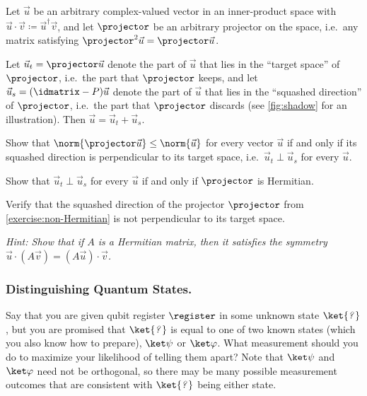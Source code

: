       \begin{exercise}\label{exercise:Hermitian}
        Let $\vec{u}$ be an arbitrary complex-valued vector 
        in an inner-product space 
        with %
        $\vec u \cdot \vec v \coloneqq \vec{u}^\dagger \vec{v}$,
        and let $\projector$ be an arbitrary projector on the space, i.e.\ any matrix
        satisfying $\projector^2 \vec{u} = \projector \vec{u}$.

        Let $\vec{u}_t = \projector \vec u$ denote the part of $\vec u$ that
        lies in the ``target space'' of $\projector$,
        i.e.\ the part that $\projector$ keeps, and let 
        $\vec{u}_s = (\idmatrix - P) \vec u$ 
        denote the part of $\vec u$ that lies in the ``squashed direction'' of
        $\projector$, i.e.\ the part that $\projector$ discards (see 
        \cref{fig:shadow} for an illustration). Then $\vec u = \vec{u}_t + \vec{u}_s$.
        \begin{subex}
          \item Show that $\norm{\projector \vec u} \leq \norm{\vec u}$ for
            every vector $\vec u$ if and only if its squashed direction is
            perpendicular to its target space, i.e.\ 
            $\vec{u}_t \perp \vec{u}_s$ for every $\vec u$.
          \item Show that 
            $\vec{u}_t \perp \vec{u}_s$ for every $\vec u$
            if and only if $\projector$ is Hermitian. 
          \item Verify that the squashed direction of the projector $\projector$
            from \cref{exercise:non-Hermitian} is not perpendicular to its
            target space.
        \end{subex}
        \emph{
          Hint: Show that if $A$ is a Hermitian matrix, then it satisfies the symmetry
          $\vec u \cdot (A \vec v) = (A \vec u) \cdot \vec v$.
        }
      \end{exercise}


    \subsubsection{Distinguishing Quantum States.}
      \newcommand{\unknown}{\ket{\emph{?}\, }} %
      Say that you are given qubit register $\register$ in some unknown state $\unknown$,
        but you are promised that $\unknown$ is equal to one of two known states (which
        you also know how to prepare), $\ket\psi$ or $\ket\varphi$. What
        measurement should you do to maximize your likelihood of telling them
        apart? Note that $\ket\psi$ and $\ket\varphi$ need not be orthogonal, so
        there may be many possible measurement outcomes that are consistent with
        $\unknown$ being either state.

